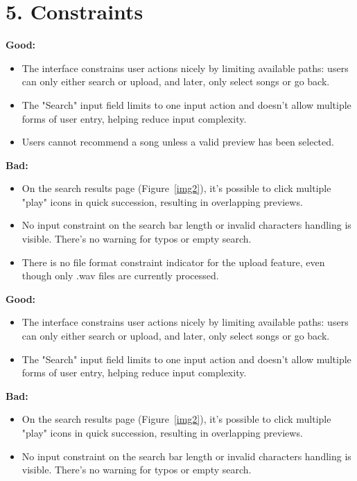 \documentclass[12pt]{article}
\begin{document}
\section*{5. Constraints}

\textbf{Good:}
\begin{itemize}
    \item The interface constrains user actions nicely by limiting available paths: users can only either search or upload, and later, only select songs or go back.
    \item The "Search" input field limits to one input action and doesn’t allow multiple forms of user entry, helping reduce input complexity.
    \item Users cannot recommend a song unless a valid preview has been selected.
\end{itemize}

\textbf{Bad:}
\begin{itemize}
    \item On the search results page (Figure~\ref{img2}), it's possible to click multiple "play" icons in quick succession, resulting in overlapping previews.
    \item No input constraint on the search bar length or invalid characters handling is visible. There’s no warning for typos or empty search.
    \item There is no file format constraint indicator for the upload feature, even though only .wav files are currently processed.
\end{itemize}


\textbf{Good:}
\begin{itemize}
    \item The interface constrains user actions nicely by limiting available paths: users can only either search or upload, and later, only select songs or go back.
    \item The "Search" input field limits to one input action and doesn’t allow multiple forms of user entry, helping reduce input complexity.
\end{itemize}

\textbf{Bad:}
\begin{itemize}
    \item On the search results page (Figure~\ref{img2}), it's possible to click multiple "play" icons in quick succession, resulting in overlapping previews.
    \item No input constraint on the search bar length or invalid characters handling is visible. There’s no warning for typos or empty search.
\end{itemize}
\end{document}
